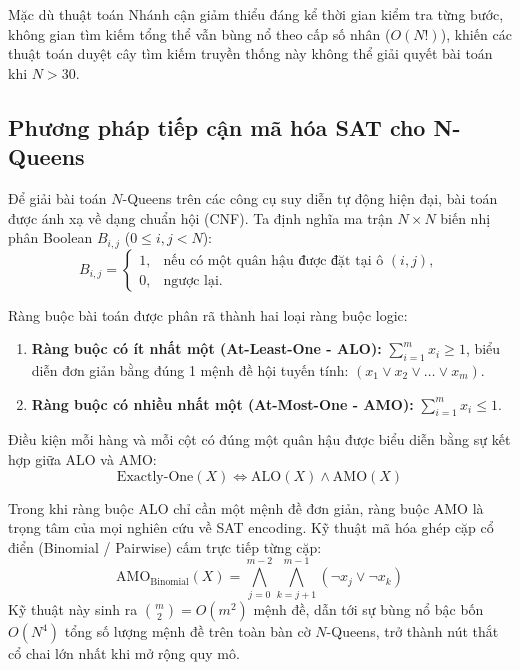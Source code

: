 \documentclass[a4paper,fleqn]{cas-sc}
\begin{document}
Mặc dù thuật toán Nhánh cận giảm thiểu đáng kể thời gian kiểm tra từng bước, không gian tìm kiếm tổng thể vẫn bùng nổ theo cấp số nhân ($O(N!)$), khiến các thuật toán duyệt cây tìm kiếm truyền thống này không thể giải quyết bài toán khi $N > 30$.

\subsection{Phương pháp tiếp cận mã hóa SAT cho N-Queens}
\label{subsec:sat_encoding_intro}
Để giải bài toán $N$-Queens trên các công cụ suy diễn tự động hiện đại, bài toán được ánh xạ về dạng chuẩn hội (CNF). Ta định nghĩa ma trận $N \times N$ biến nhị phân Boolean $B_{i,j}$ ($0 \le i, j < N$):
\begin{equation}
B_{i,j} = \begin{cases}
1, & \text{nếu có một quân hậu được đặt tại ô } (i, j), \\
0, & \text{ngược lại.}
\end{cases}
\end{equation}

Ràng buộc bài toán được phân rã thành hai loại ràng buộc logic:
\begin{enumerate}
    \item \textbf{Ràng buộc có ít nhất một (At-Least-One - ALO):} $\sum_{i=1}^m x_i \ge 1$, biểu diễn đơn giản bằng đúng 1 mệnh đề hội tuyến tính: $(x_1 \lor x_2 \lor \dots \lor x_m)$.
    \item \textbf{Ràng buộc có nhiều nhất một (At-Most-One - AMO):} $\sum_{i=1}^m x_i \le 1$.
\end{enumerate}

Điều kiện mỗi hàng và mỗi cột có đúng một quân hậu được biểu diễn bằng sự kết hợp giữa ALO và AMO:
\begin{equation}
\text{Exactly-One}(X) \iff \text{ALO}(X) \land \text{AMO}(X)
\end{equation}

Trong khi ràng buộc ALO chỉ cần một mệnh đề đơn giản, ràng buộc AMO là trọng tâm của mọi nghiên cứu về SAT encoding. Kỹ thuật mã hóa ghép cặp cổ điển (Binomial / Pairwise) cấm trực tiếp từng cặp:
\begin{equation}
\text{AMO}_{\text{Binomial}}(X) = \bigwedge_{j=0}^{m-2} \bigwedge_{k=j+1}^{m-1} (\neg x_j \lor \neg x_k)
\end{equation}
Kỹ thuật này sinh ra $\binom{m}{2} = O(m^2)$ mệnh đề, dẫn tới sự bùng nổ bậc bốn $O(N^4)$ tổng số lượng mệnh đề trên toàn bàn cờ $N$-Queens, trở thành nút thắt cổ chai lớn nhất khi mở rộng quy mô.
\end{document}
